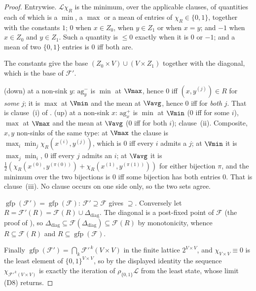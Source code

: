 \begin{proof}
Entrywise. $\mathcal L\chi_R$ is the minimum, over the applicable clauses,
of quantities each of which is a $\min$, a $\max$ or a mean of entries of
$\chi_R\in\{0,1\}$, together with the constants $1$; $0$ when $x\in Z_0$,
when $y\in Z_1$ or when $x=y$; and $-1$ when $x\in Z_0$ and $y\in Z_1$.
Such a quantity is $\le0$ exactly when it is $0$ or $-1$; and a mean of
two $\{0,1\}$ entries is $0$ iff both are.

The constants give the base $(Z_0\times V)\cup(V\times Z_1)$ together with
the diagonal, which is the base of $\mathcal F'$.

(down) at a non-sink $y$: $\mathrm{ag}^{-}_{y}$ is $\min$ at $\Vmax$,
hence $0$ iff $(x,y^{(j)})\in R$ for \emph{some} $j$; it is $\max$ at
$\Vmin$ and the mean at $\Vavg$, hence $0$ iff for \emph{both} $j$. That
is clause~(i) of . (up) at a non-sink $x$:
$\mathrm{ag}^{+}_{x}$ is $\min$ at $\Vmin$ ($0$ iff for some $i$), $\max$
at $\Vmax$ and the mean at $\Vavg$ ($0$ iff for both $i$); clause~(ii).
Composite, $x,y$ non-sinks of the same type: at $\Vmax$ the clause is
$\max_i\min_j\chi_R(x^{(i)},y^{(j)})$, which is $0$ iff every $i$ admits a
$j$; at $\Vmin$ it is $\max_j\min_i$, $0$ iff every $j$ admits an $i$; at
$\Vavg$ it is
$\tfrac12(\chi_R(x^{(0)},y^{(\pi(0))})+\chi_R(x^{(1)},y^{(\pi(1))}))$ for
either bijection $\pi$, and the minimum over the two bijections is $0$ iff
some bijection has both entries $0$. That is clause~(iii). No clause
occurs on one side only, so the two sets agree.

$\operatorname{gfp}(\mathcal F')=\operatorname{gfp}(\mathcal F)$:
$\mathcal F'\supseteq\mathcal F$ gives $\supseteq$. Conversely let
$R=\mathcal F'(R)=\mathcal F(R)\cup\Delta_{\mathrm{diag}}$. The diagonal
is a post-fixed point of $\mathcal F$ (the proof of
), so
$\Delta_{\mathrm{diag}}\subseteq\mathcal F(\Delta_{\mathrm{diag}})
\subseteq\mathcal F(R)$ by monotonicity, whence $R\subseteq\mathcal F(R)$
and $R\subseteq\operatorname{gfp}(\mathcal F)$.

Finally $\operatorname{gfp}(\mathcal F')=\bigcap_k\mathcal F'^{\,k}(V\times V)$
in the finite lattice $2^{V\times V}$, and $\chi_{V\times V}\equiv0$ is
the least element of $\{0,1\}^{V\times V}$, so by the displayed identity
the sequence $\chi_{\mathcal F'^{\,k}(V\times V)}$ is exactly the
iteration of $\rho_{\{0,1\}}\mathcal L$ from the least state, whose limit
\textup{(D8)} returns.
\end{proof}

